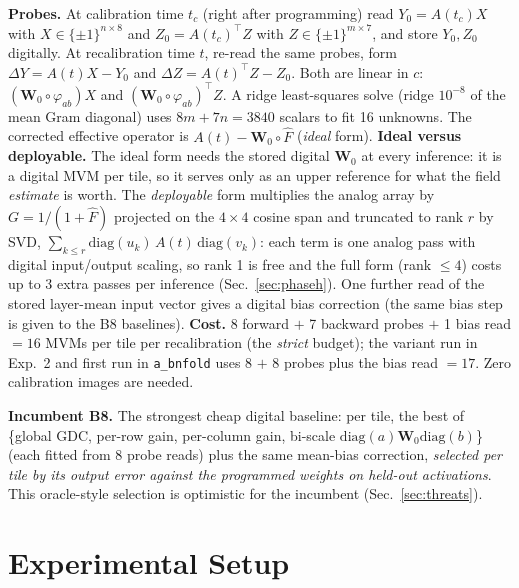 \documentclass[journal]{IEEEtran}
\newcommand{\bviii}{\textsc{B8}}
\newcommand{\W}{\mathbf{W}}
\begin{document}
\textbf{Probes.} At calibration time $t_c$ (right after programming) read $Y_0=A(t_c)X$ with $X\in\{\pm1\}^{n\times 8}$ and $Z_0=A(t_c)^{\!\top}Z$ with $Z\in\{\pm1\}^{m\times 7}$,
and store $Y_0,Z_0$ digitally. At recalibration time $t$, re-read the same probes, form $\Delta Y=A(t)X-Y_0$ and $\Delta Z=A(t)^{\!\top}Z-Z_0$. Both are linear in $c$:
$(\W_0\circ\varphi_{ab})X$ and $(\W_0\circ\varphi_{ab})^{\!\top}Z$. A ridge least-squares solve (ridge $10^{-8}$ of the mean Gram diagonal) uses $8m+7n=3840$ scalars to fit 16 unknowns.
The corrected effective operator is $A(t)-\W_0\circ\hat F$ (\emph{ideal} form).
\textbf{Ideal versus deployable.} The ideal form needs the stored digital $\W_0$ at every inference: it is a digital MVM per tile, so it serves only as an upper reference for what the field \emph{estimate} is worth.
The \emph{deployable} form multiplies the analog array by $G=1/(1+\hat F)$ projected on the $4\times4$ cosine span and truncated to rank $r$ by SVD, $\sum_{k\le r}\mathrm{diag}(u_k)\,A(t)\,\mathrm{diag}(v_k)$: each term is one analog pass with digital input/output scaling, so rank 1 is free and the full form (rank $\le4$) costs up to 3 extra passes per inference (Sec.~\ref{sec:phaseh}).
One further read of the stored layer-mean input vector gives a digital bias correction (the same bias step is given to the \bviii{} baselines).
\textbf{Cost.} 8 forward $+$ 7 backward probes $+$ 1 bias read $=16$ MVMs per tile per recalibration (the \emph{strict} budget);
the variant run in Exp.~2 and first run in \texttt{a\_bnfold} uses 8 $+$ 8 probes plus the bias read $=17$. Zero calibration images are needed.

\textbf{Incumbent \bviii{}.} The strongest cheap digital baseline: per tile, the best of \{global GDC, per-row gain, per-column gain, bi-scale
$\mathrm{diag}(a)\W_0\mathrm{diag}(b)$\} (each fitted from 8 probe reads) plus the same mean-bias correction, \emph{selected per tile by its output error against the programmed weights on held-out activations}.
This oracle-style selection is optimistic for the incumbent (Sec.~\ref{sec:threats}).
\section{Experimental Setup}
\label{sec:method-sim}
\end{document}
